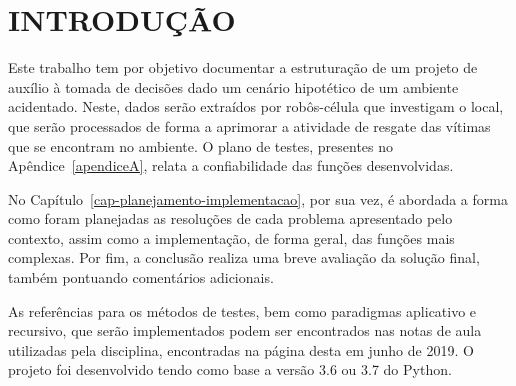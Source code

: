 \chapter*[INTRODUÇÃO]{INTRODUÇÃO}\label{cap-introducao} %

Este trabalho tem por objetivo documentar a estruturação de um projeto de auxílio à tomada de decisões dado um cenário hipotético de um ambiente acidentado. Neste, dados serão extraídos por robôs-célula que investigam o local, que serão processados de forma a aprimorar a atividade de resgate das vítimas que se encontram no ambiente. O plano de testes, presentes no Apêndice~\ref{apendiceA}, relata a confiabilidade das funções desenvolvidas.

No Capítulo~\ref{cap-planejamento-implementacao}, por sua vez, é abordada a forma como foram planejadas as resoluções de cada problema apresentado pelo contexto, assim como a implementação, de forma geral, das funções mais complexas. Por fim, a conclusão realiza uma breve avaliação da solução final, também pontuando comentários adicionais.

As referências para os métodos de testes, bem como paradigmas aplicativo e recursivo, que serão implementados podem ser encontrados nas notas de aula utilizadas pela disciplina, encontradas na página desta em junho de 2019. O projeto foi desenvolvido tendo como base a versão 3.6 ou 3.7 do Python.

